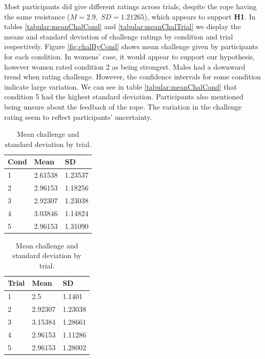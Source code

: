 Most participants did give different ratings across trials, despite the rope having the same resistance ($M=2.9,\; SD=1.21265 $), which appears to support \textbf{H1}. In tables \ref{tabular:meanChalCond} and \ref{tabular:meanChalTrial} we display the means and standard deviation of challenge ratings by condition and trial respectively.
Figure \ref{fig:chalByCond} shows mean challenge given by participants for each condition. In womens' case, it would appear to support our hypothesis, however women rated condition 2 as being strongest. Males had a downward trend when rating challenge. However, the confidence intervals for some condition indicate large variation. We can see in table \ref{tabular:meanChalCond} that condition 5 had the highest standard deviation. Participants also mentioned being unsure about the feedback of the rope. The variation in the challenge rating seem to reflect participants' uncertainty. 

\begin{table}[H]
 \captionsetup{justification=centering,margin=0.1cm}
 \begin{minipage}{.5\linewidth}
     \centering
\begin{tabular}{|lll|}
\hline
Cond & Mean & SD \\
\hline
1 & 2.61538 & 1.23537\\  
2 &  2.96153 & 1.18256\\ 
3 &  2.92307 & 1.23038\\ 
4 &  3.03846 & 1.14824\\  
5 & 2.96153 & 1.31090\\  
\hline
\end{tabular}
\caption{Mean challenge and standard deviation by condition.}
\label{tabular:meanChalCond}
\end{minipage}\hfill
 \begin{minipage}{.5\linewidth}
 \centering
\begin{tabular}{|lll|}
\hline
Trial & Mean & SD \\
\hline
1 & 2.5 & 1.1401\\  
2 & 2.92307 & 1.23038\\  
3 & 3.15384 &  1.28661\\  
4 & 2.96153 & 1.11286\\  
5 & 2.96153 & 1.28002\\  
\hline
\end{tabular}
\caption{Mean challenge and standard deviation by trial.}
\label{tabular:meanChalTrial}
\end{minipage}
\label{tbl:meanChalCond1}
\end{table} 

